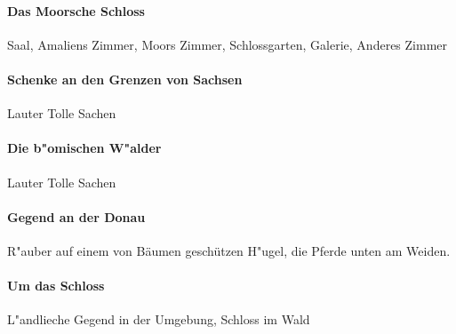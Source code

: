 \paragraph{Das Moorsche Schloss}
Saal, Amaliens Zimmer, Moors Zimmer, Schlossgarten, Galerie, Anderes Zimmer
\paragraph{Schenke an den Grenzen von Sachsen}
Lauter Tolle Sachen
\paragraph{Die b"omischen W"alder}
Lauter Tolle Sachen
\paragraph{Gegend an der Donau}
R"auber auf einem von Bäumen geschützen H"ugel, die Pferde unten am Weiden.
\paragraph{Um das Schloss}
L"andlieche Gegend in der Umgebung, Schloss im Wald